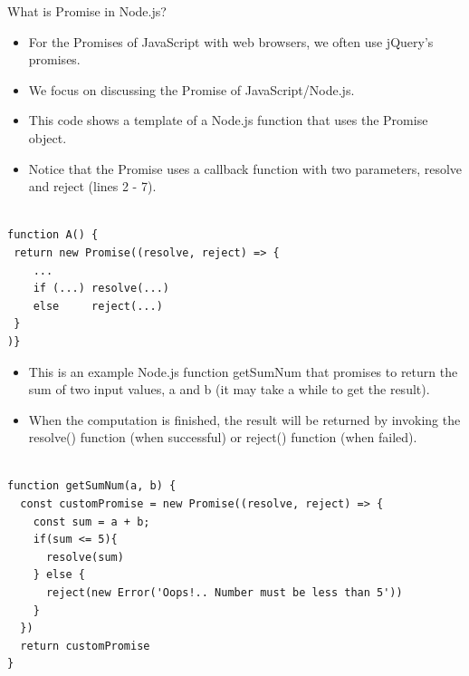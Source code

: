 \begin{frame}[fragile]{What is Promise in Node.js?}

\begin{itemize}
	\item For the Promises of JavaScript with web browsers, we often use jQuery's promises. 
	\item We focus on discussing the Promise of JavaScript/Node.js. 
	\item This code shows a template of a Node.js function that uses the Promise object.
	\item Notice that the Promise uses a callback function with two parameters, resolve and reject (lines 2 - 7).
\end{itemize}

\begin{Code}{}%
\begin{lstlisting}[firstnumber=1, label=glabels, xleftmargin=0pt, basicstyle=\tiny]% 

function A() {
 return new Promise((resolve, reject) => {
    ...
    if (...) resolve(...)
    else     reject(...)
 }  
)}
\end{lstlisting}%
\end{Code}%

\end{frame}

\begin{frame}[fragile]{}
\begin{itemize}
	\item This is an example Node.js function getSumNum that promises to return the sum of two input values, a and b (it may take a while to get the result). 
	\item When the computation is finished, the result will be returned by invoking the resolve() function (when successful) or reject() function (when failed). 
\end{itemize}

\begin{Code}{}%
\begin{lstlisting}[firstnumber=1, label=glabels, xleftmargin=0pt, basicstyle=\scriptsize]% 

function getSumNum(a, b) {
  const customPromise = new Promise((resolve, reject) => {
    const sum = a + b;
    if(sum <= 5){
      resolve(sum)
    } else {
      reject(new Error('Oops!.. Number must be less than 5'))
    }
  })
  return customPromise
}
\end{lstlisting}%
\end{Code}%
\end{frame}

